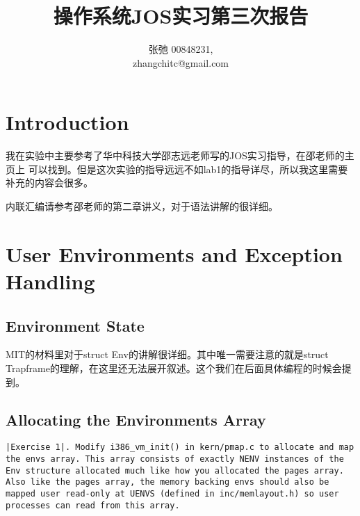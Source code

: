 \documentclass{article}
\newcommand{\funcname}[1]{{\ttfamily \small #1}}
\begin{document}
\begin{CJK*}{UTF8}{gkai}

\title{操作系统JOS实习第三次报告}
\author{张弛 \hspace{1ex} 00848231, \\
        zhangchitc@gmail.com}

\maketitle
\tableofcontents
\newpage

\section{Introduction}

我在实验中主要参考了华中科技大学邵志远老师写的JOS实习指导，在邵老师的主页上 可以找到。但是这次实验的指导远远不如lab1的指导详尽，所以我这里需要补充的内容会很多。

内联汇编请参考邵老师的第二章讲义，对于语法讲解的很详细。

\section{User Environments and Exception Handling}


\subsection{Environment State}

MIT的材料里对于\funcname{struct Env}的讲解很详细。其中唯一需要注意的就是\funcname{struct Trapframe}的理解，在这里还无法展开叙述。这个我们在后面具体编程的时候会提到。

\subsection{Allocating the Environments Array}


\begin{lstlisting}[style=exercise]
|Exercise 1|. Modify i386_vm_init() in kern/pmap.c to allocate and map the envs array. This array consists of exactly NENV instances of the Env structure allocated much like how you allocated the pages array. Also like the pages array, the memory backing envs should also be mapped user read-only at UENVS (defined in inc/memlayout.h) so user processes can read from this array.


\end{lstlisting}
\end{CJK*}
\end{document}
